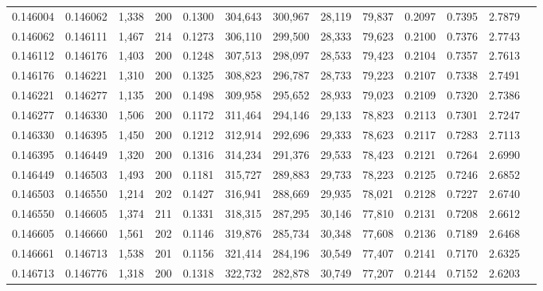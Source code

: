 \begin{tabular}{rrrrrrrrrrrrr}
0.146004 & 0.146062 & 1,338 & 200 &                                     0.1300 & 304,643 & 300,967 &  28,119 &  79,837 & 0.2097 & 0.7395 & 2.7879 \\
0.146062 & 0.146111 & 1,467 & 214 &                                     0.1273 & 306,110 & 299,500 &  28,333 &  79,623 & 0.2100 & 0.7376 & 2.7743 \\
0.146112 & 0.146176 & 1,403 & 200 &                                     0.1248 & 307,513 & 298,097 &  28,533 &  79,423 & 0.2104 & 0.7357 & 2.7613 \\
0.146176 & 0.146221 & 1,310 & 200 &                                     0.1325 & 308,823 & 296,787 &  28,733 &  79,223 & 0.2107 & 0.7338 & 2.7491 \\
0.146221 & 0.146277 & 1,135 & 200 &                                     0.1498 & 309,958 & 295,652 &  28,933 &  79,023 & 0.2109 & 0.7320 & 2.7386 \\
0.146277 & 0.146330 & 1,506 & 200 &                                     0.1172 & 311,464 & 294,146 &  29,133 &  78,823 & 0.2113 & 0.7301 & 2.7247 \\
0.146330 & 0.146395 & 1,450 & 200 &                                     0.1212 & 312,914 & 292,696 &  29,333 &  78,623 & 0.2117 & 0.7283 & 2.7113 \\
0.146395 & 0.146449 & 1,320 & 200 &                                     0.1316 & 314,234 & 291,376 &  29,533 &  78,423 & 0.2121 & 0.7264 & 2.6990 \\
0.146449 & 0.146503 & 1,493 & 200 &                                     0.1181 & 315,727 & 289,883 &  29,733 &  78,223 & 0.2125 & 0.7246 & 2.6852 \\
0.146503 & 0.146550 & 1,214 & 202 &                                     0.1427 & 316,941 & 288,669 &  29,935 &  78,021 & 0.2128 & 0.7227 & 2.6740 \\
0.146550 & 0.146605 & 1,374 & 211 &                                     0.1331 & 318,315 & 287,295 &  30,146 &  77,810 & 0.2131 & 0.7208 & 2.6612 \\
0.146605 & 0.146660 & 1,561 & 202 &                                     0.1146 & 319,876 & 285,734 &  30,348 &  77,608 & 0.2136 & 0.7189 & 2.6468 \\
0.146661 & 0.146713 & 1,538 & 201 &                                     0.1156 & 321,414 & 284,196 &  30,549 &  77,407 & 0.2141 & 0.7170 & 2.6325 \\
0.146713 & 0.146776 & 1,318 & 200 &                                     0.1318 & 322,732 & 282,878 &  30,749 &  77,207 & 0.2144 & 0.7152 & 2.6203 \\

\end{tabular}
